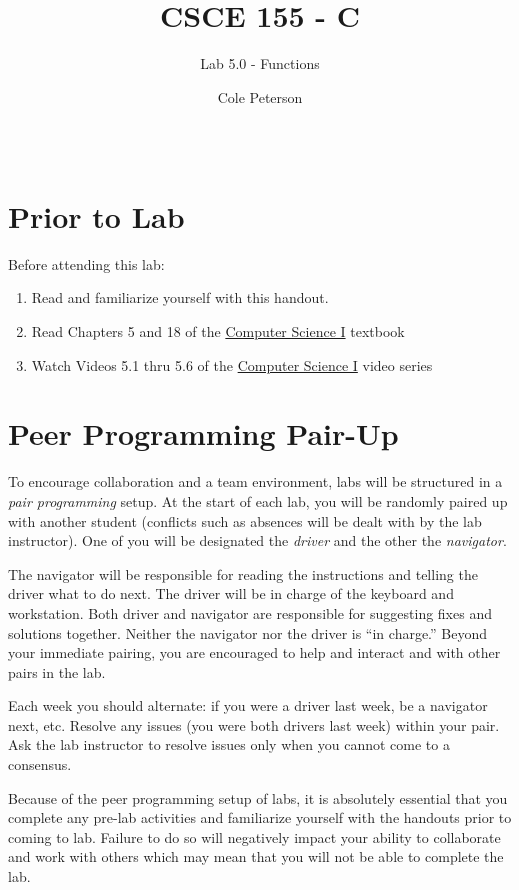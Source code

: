 \documentclass[12pt]{scrartcl}
\title{CSCE 155 - C}
\subtitle{Lab 5.0 - Functions}
\author{Cole Peterson}
\date{~}
\begin{document}
\maketitle

\section*{Prior to Lab}

Before attending this lab:
\begin{enumerate}
  \item Read and familiarize yourself with this handout.
  \item Read Chapters 5 and 18 of the \href{http://cse.unl.edu/~cbourke/ComputerScienceOne.pdf}{Computer Science I} textbook
  \item Watch Videos 5.1 thru 5.6 of the \href{https://www.youtube.com/playlist?list=PL4IH6CVPpTZVkiEnCEOdGbYsFEdtKc5Bx}{Computer Science I} video series
\end{enumerate}

\section*{Peer Programming Pair-Up}

To encourage collaboration and a team environment, labs will be
structured in a \emph{pair programming} setup.  At the start of
each lab, you will be randomly paired up with another student 
(conflicts such as absences will be dealt with by the lab instructor).
One of you will be designated the \emph{driver} and the other
the \emph{navigator}.  

The navigator will be responsible for reading the instructions and
telling the driver what to do next.  The driver will be in charge of the
keyboard and workstation.  Both driver and navigator are responsible
for suggesting fixes and solutions together.  Neither the navigator
nor the driver is ``in charge.''  Beyond your immediate pairing, you
are encouraged to help and interact and with other pairs in the lab.

Each week you should alternate: if you were a driver last week, 
be a navigator next, etc.  Resolve any issues (you were both drivers
last week) within your pair.  Ask the lab instructor to resolve issues
only when you cannot come to a consensus.  

Because of the peer programming setup of labs, it is absolutely 
essential that you complete any pre-lab activities and familiarize
yourself with the handouts prior to coming to lab.  Failure to do
so will negatively impact your ability to collaborate and work with 
others which may mean that you will not be able to complete the
lab.  
\end{document}
